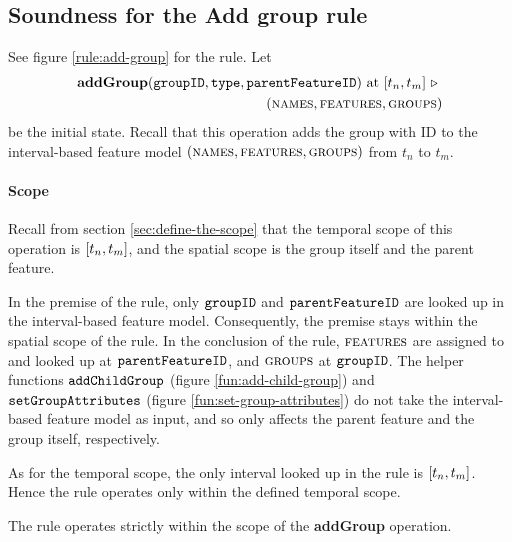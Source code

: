 
\subsection{Soundness for the Add group rule}
\label{sub:soundness-for-the-add-group-rule}

See figure \vref{rule:add-group} for the  rule. 
Let 
\begin{equation*}
   \begin{split}
      \textbf{addGroup}(\var{groupID}, \var{type}, \var{parentFeatureID})\text{ at }\interval{t_n}{t_m}
      \shove \\
   (\names{}, \features{}, \groups{})
\end{split}
\end{equation*}
be the initial state. Recall that this operation adds the group with ID  to the interval-based feature model $(\textsc{names}{}, \textsc{features}{}, \textsc{groups}{}{})$ from $t_n$ to $t_m$. 

\paragraph{Scope}

Recall from section \vref{sec:define-the-scope} that the temporal scope of this operation is $\interval{t_n}{t_m}$, and the spatial scope is the group itself and the parent feature.

In the premise of the rule, only $\texttt{groupID}$ and $\texttt{parentFeatureID}$ are looked up in the interval-based feature model. Consequently, the premise stays within the spatial scope of the rule. In the conclusion of the rule, $\textsc{features}{}$ are assigned to and looked up at $\texttt{parentFeatureID}$, and $\textsc{groups}{}{}$ at $\texttt{groupID}$. The helper functions $\texttt{addChildGroup}$ (figure \vref{fun:add-child-group}) and $\texttt{setGroupAttributes}$ (figure \vref{fun:set-group-attributes}) do not take the interval-based feature model as input, and so only affects the parent feature and the group itself, respectively.

As for the temporal scope, the only interval looked up in the rule is $\interval{t_n}{t_m}$. Hence the rule operates only within the defined temporal scope.
\\

\begin{lemma}
   The  rule operates strictly within the scope of the \textbf{addGroup} operation.
   \label{lemma:add-group-scope}
\end{lemma}

